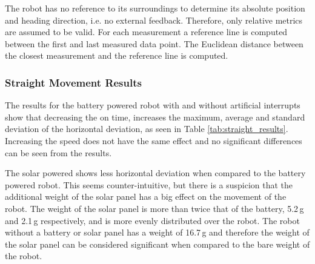 The robot has no reference to its surroundings to determine its absolute position and heading direction, i.e. no external feedback.
Therefore, only relative metrics are assumed to be valid.
For each measurement a reference line is computed between the first and last measured data point.
The Euclidean distance between the closest measurement and the reference line is computed.

\subsubsection{Straight Movement Results}

The results for the battery powered robot with and without artificial interrupts show that decreasing the on time, increases the maximum, average and standard deviation of the horizontal deviation, as seen in Table \ref{tab:straight_results}.
Increasing the speed does not have the same effect and no significant differences can be seen from the results.

The solar powered shows less horizontal deviation when compared to the battery powered robot.
This seems counter-intuitive, but there is a suspicion that the additional weight of the solar panel has a big effect on the movement of the robot.
The weight of the solar panel is more than twice that of the battery, 5.2\,g and 2.1\,g respectively, and is more evenly distributed over the robot.
The robot without a battery or solar panel has a weight of 16.7\,g and therefore the weight of the solar panel can be considered significant when compared to the bare weight of the robot.

